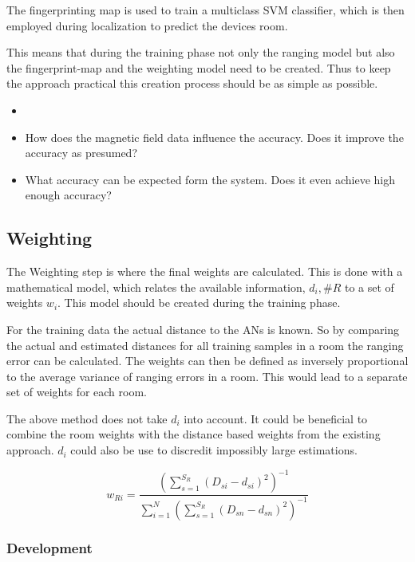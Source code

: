 The fingerprinting map is used to train a multiclass SVM classifier, which is then employed during localization to predict the devices room.

This means that during the training phase not only the ranging model but also the fingerprint-map and the weighting model need to be created. Thus to keep the approach practical this creation process should be as simple as possible.


\begin{itemize}
\item {}
\item How does the magnetic field data influence the accuracy. Does it improve the accuracy as presumed?
\item What accuracy can be expected form the system. Does it even achieve high enough accuracy?
\end{itemize}

\subsection{Weighting}

The Weighting step is where the final weights are calculated. This is done with a mathematical model, which relates the available information, \(d_i,\#R\) to a set of weights \(w_i\). This model should be created during the training phase.

For the training data the actual distance to the ANs is known. So by comparing the actual and estimated distances for all training samples in a room the ranging error can be calculated. The weights can then be defined as inversely proportional to the average variance of ranging errors in a room. This would lead to a separate set of weights for each room.

The above method does not take \(d_i\) into account. It could be beneficial to combine the room weights with the distance based weights from the existing approach. \(d_i\) could also be use to discredit impossibly large estimations.

\begin{equation}
w_{Ri}=\frac{(\sum_{s=1}^{S_R}{(D_{si}-d_{si})^2})^{-1}}{\sum_{i=1}^{N}{(\sum_{s=1}^{S_R}{(D_{sn}-d_{sn})^2})^{-1}}}
\end{equation}


\subsubsection{Development}
\label{WeightingModelDefinition}

